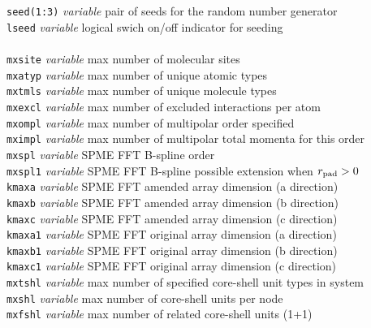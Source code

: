 \begin{tabbing}
\> {\tt seed(1:3)}   \> {\em variable}       \> pair of seeds for the random number generator \\
\> {\tt lseed}       \> {\em variable}       \> logical swich on/off indicator for seeding \\
\>                   \>                      \> \\
\> {\tt mxsite}      \> {\em variable}       \> max number of molecular sites \\
\> {\tt mxatyp}      \> {\em variable}       \> max number of unique atomic types \\
\> {\tt mxtmls}      \> {\em variable}       \> max number of unique molecule types \\
\> {\tt mxexcl}      \> {\em variable}       \> max number of excluded interactions per atom \\
\> {\tt mxompl}      \> {\em variable}       \> max number of multipolar order specified \\
\> {\tt mximpl}      \> {\em variable}       \> max number of multipolar total momenta for this order \\
\> {\tt mxspl}       \> {\em variable}       \> SPME FFT B-spline order \\
\> {\tt mxspl1}      \> {\em variable}       \> SPME FFT B-spline possible extension when $r_{\rm pad}>0$ \\
\> {\tt kmaxa}       \> {\em variable}       \> SPME FFT amended array dimension (a direction) \\
\> {\tt kmaxb}       \> {\em variable}       \> SPME FFT amended array dimension (b direction) \\
\> {\tt kmaxc}       \> {\em variable}       \> SPME FFT amended array dimension (c direction) \\
\> {\tt kmaxa1}      \> {\em variable}       \> SPME FFT original array dimension (a direction) \\
\> {\tt kmaxb1}      \> {\em variable}       \> SPME FFT original array dimension (b direction) \\
\> {\tt kmaxc1}      \> {\em variable}       \> SPME FFT original array dimension (c direction) \\
\> {\tt mxtshl}      \> {\em variable}       \> max number of specified core-shell unit types in system \\
\> {\tt mxshl}       \> {\em variable}       \> max number of core-shell units per node \\
\> {\tt mxfshl}      \> {\em variable}       \> max number of related core-shell units (1+1) \\

\end{tabbing}
